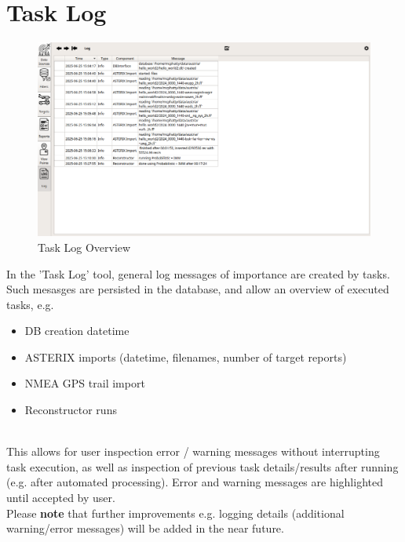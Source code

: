 
\section{Task Log}
\label{sec:task_log}

\begin{figure}[H]
    \hspace*{-2.5cm}
    \includegraphics[width=19cm,frame]{figures/task_log.png}
  \caption{Task Log Overview}
\end{figure}

In the 'Task Log' tool, general log messages of importance are created by tasks. Such mesasges are persisted in the database, and allow an overview of executed tasks, e.g.

\begin{itemize}
  \item DB creation datetime
  \item ASTERIX imports (datetime, filenames, number of target reports)
  \item NMEA GPS trail import
  \item Reconstructor runs
\end{itemize} 
\  \\

This allows for user inspection error / warning messages without interrupting task execution, as well as inspection of previous task details/results after running (e.g. after automated processing). Error and warning messages are highlighted until accepted by user.
\\

Please \textbf{note} that further improvements e.g. logging details (additional warning/error messages) will be added in the near future.
